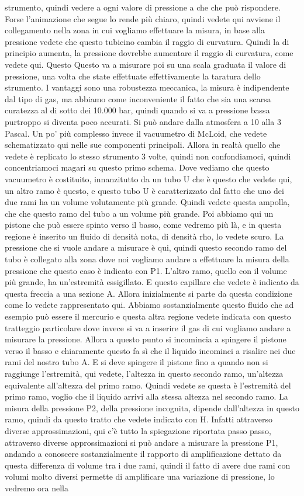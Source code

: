 strumento, quindi vedere a ogni valore di pressione a che che può rispondere. Forse l'animazione che segue lo rende più chiaro, quindi vedete qui avviene il collegamento nella zona in cui vogliamo effettuare la misura, in base alla pressione vedete che questo tubicino cambia il raggio di curvatura. Quindi la di principio aumenta, la pressione dovrebbe aumentare il raggio di curvatura, come vedete qui. Questo Questo va a misurare poi su una scala graduata il valore di pressione, una volta che state effettuate effettivamente la taratura dello strumento. I vantaggi sono una robustezza meccanica, la misura è indipendente dal tipo di gas, ma abbiamo come inconveniente il fatto che sia una scarsa curatezza al di sotto dei 10.000 bar, quindi quando si va a pressione bassa purtroppo si diventa poco accurati. Si può andare dalla atmosfera a 10 alla 3 Pascal. Un po' più complesso invece il vacuumetro di McLoid, che vedete schematizzato qui nelle sue componenti principali. Allora in realtà quello che vedete è replicato lo stesso strumento 3 volte, quindi non confondiamoci, quindi concentriamoci magari su questo primo schema. Dove vediamo che questo vacuumetro è costituito, innanzitutto da un tubo U che è questo che vedete qui, un altro ramo è questo, e questo tubo U è caratterizzato dal fatto che uno dei due rami ha un volume volutamente più grande. Quindi vedete questa ampolla, che che questo ramo del tubo a un volume più grande. Poi abbiamo qui un pistone che può essere spinto verso il basso, come vedremo più là, e in questa regione è inserito un fluido di densità nota, di densità rho, lo vedete scuro. La pressione che si vuole andare a misurare è qui, quindi questo secondo ramo del tubo è collegato alla zona dove noi vogliamo andare a effettuare la misura della pressione che questo caso è indicato con P1. L'altro ramo, quello con il volume più grande, ha un'estremità essigillato. E questo capillare che vedete è indicato da questa freccia a una sezione A. Allora inizialmente si parte da questa condizione come lo vedete rappresentato qui. Abbiamo sostanzialmente questo fluido che ad esempio può essere il mercurio e questa altra regione vedete indicata con questo tratteggio particolare dove invece si va a inserire il gas di cui vogliamo andare a misurare la pressione. Allora a questo punto si incomincia a spingere il pistone verso il basso e chiaramente questo fa sì che il liquido incominci a risalire nei due rami del nostro tubo A. E si deve spingere il pistone fino a quando non si raggiunge l'estremità, qui vedete, l'altezza in questo secondo ramo, un'altezza equivalente all'altezza del primo ramo. Quindi vedete se questa è l'estremità del primo ramo, voglio che il liquido arrivi alla stessa altezza nel secondo ramo. La misura della pressione P2, della pressione incognita, dipende dall'altezza in questo ramo, quindi da questo tratto che vedete indicato con H. Infatti attraverso diverse approssimazioni, qui c'è tutto la spiegazione riportata passo passo, attraverso diverse approssimazioni si può andare a misurare la pressione P1, andando a conoscere sostanzialmente il rapporto di amplificazione dettato da questa differenza di volume tra i due rami, quindi il fatto di avere due rami con volumi molto diversi permette di amplificare una variazione di pressione, lo vedremo ora nella 